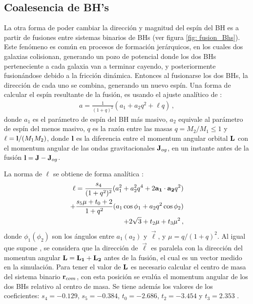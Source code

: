 \subsection{Coalesencia de BH's}
\label{subsec:fusion_BHs}
La otra forma de poder cambiar la dirección y magnitud del espín del BH es a partir de fusiones entre  sistemas binarios de BHs (ver figura \ref{fig: fusion_Bhs}). Este fenómeno es común en procesos de formación jerárquicos, en los cuales dos galaxias colisionan, generando un pozo de potencial donde los dos BHs perteneciente a cada galaxia van a terminar cayendo, y posteriormente fusionándose debido a la fricción dinámica. Entonces al fusionarse los dos BHs, la dirección de cada uno se combina, generando un nuevo espín. Una forma de calcular el espín resultante de la fusión, es usando el ajuste analítico de \cite{rezzolla2008}: 
%
\begin{align}
    a = \frac{1}{(1+q)^{2}}(a_{1}+a_{2}q^{2}+\ell q)\,,
\end{align}
%
donde $a_{1}$ es el parámetro de espín del BH más masivo, $a_{2}$ equivale al parámetro de espín del menos masivo, $q$ es la razón entre las masas $q=M_{2}/M_{1}\leq 1$ y $ {\bf{\ell}} = {\bf{l}}/(M_{1}M_{2})$, donde ${\bf{l}}$ es la diferencia entre el momentum angular orbital ${\bf{L}}$ con el momentum angular de las ondas gravitacionales ${\bf{J}}_{og}$, en un instante antes de la fusión ${\bf{l}}={\bf{J}}-{\bf{J}}_{og}$.

La norma de $\ell$ se obtiene de forma analítica \cite{rezzolla2008}: 
%
\begin{align}
    \ell = \frac{s_{4}}{(1+q^{2})^{2}}(a_{1}^{2}+a_{2}^{2}q^{4}+2{\bf{a_{1}\cdot a_{2}}}q^{2})\\ + \frac{s_{5}\mu + t_{0}+2}{1+q^{2}}(a_{1}\cos\phi_{1}+a_{2}q^{2}\cos\phi_{2})\\ 
    + 2\sqrt{3}+t_{2}\mu+t_{3}\mu^{2}\,,
\end{align}
donde $\phi_{1}(\phi_{2})$ son los ángulos entre $a_{1}(a_{2})$ y $\vec{\ell}$, y $\mu = q/(1+q)^{2}$. Al igual que supone \cite{rezzolla2008}, se considera que la dirección de $\Vec{\ell}$ es paralela con la dirección del momentun angular ${\bf{L=L_{1}+L_{2}}}$ antes de la fusión, el cual es un vector medido en la simulación. Para tener el valor de ${\bf{L}}$ es necesario calcular el centro de masa del sistema binario ${\bf{r}}_{com}$, con esta posición se evalúa el momentum angular de los dos BHs relativo al centro de masa. Se tiene además los valores de los coeficientes: $s_{4}=-0.129$, $s_{5}=-0.384$, $t_{0}=-2.686$, $t_{2}=-3.454$ y $t_{3}=2.353$ \cite{rezzolla2008}.

